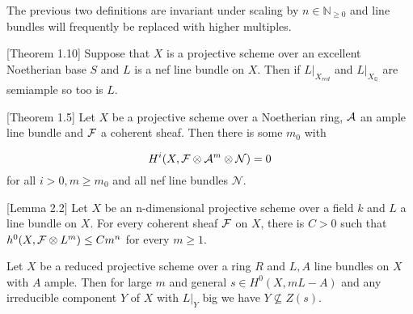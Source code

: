 The previous two definitions are invariant under scaling by $n \in \mathbb{N}_{\geq 0}$ and line bundles will frequently be replaced with higher multiples.

\begin{theorem}\cite{witaszek2020keels}[Theorem 1.10]\label{red}
	Suppose that $X$ is a projective scheme over an excellent Noetherian base $S$ and $L$ is a nef line bundle on $X$. Then if $L|_{X_{red}}$ and $L|_{X_{\mathbb{Q}}}$ are semiample so too is $L$.
\end{theorem}


\begin{theorem}\cite{keeler2003ample}[Theorem 1.5]\label{{Keeler}}
	Let $X$ be a projective scheme over a Noetherian ring, $\mathcal{A}$ an ample line bundle and $\mathcal{F}$ a coherent sheaf. Then there is some $m_{0}$ with 
	
	\[H^{i}(X, \mathcal{F} \otimes \mathcal{A}^{m} \otimes \mathcal{N})=0\]
	for all $i>0, m \geq m_{0}$ and all nef line bundles $\mathcal{N}$.
\end{theorem}


\begin{lemma}\cite{cascini2014augmented}[Lemma 2.2]\label{sec-growth}
	Let $X$ be an n-dimensional projective scheme over a field $k$ and $L$ a line bundle on $X$.
	For every coherent sheaf $\mathcal{F}$ on $X$, there is $C > 0$ such that $h^{0}(X, \mathcal{F}\otimes L^{m}) \leq C m^{n}$ for every $m \geq 1$.
\end{lemma}

\begin{lemma}\label{bigsecs}
	Let $X$ be a reduced projective scheme over a ring $R$ and $L,A$ line bundles on $X$ with $A$ ample. Then for large $m$ and general $s \in H^{0}(X,mL-A)$ and any irreducible component $Y$ of $X$ with $L|_{Y}$ big we have $Y \not \subseteq Z(s)$.
\end{lemma}

